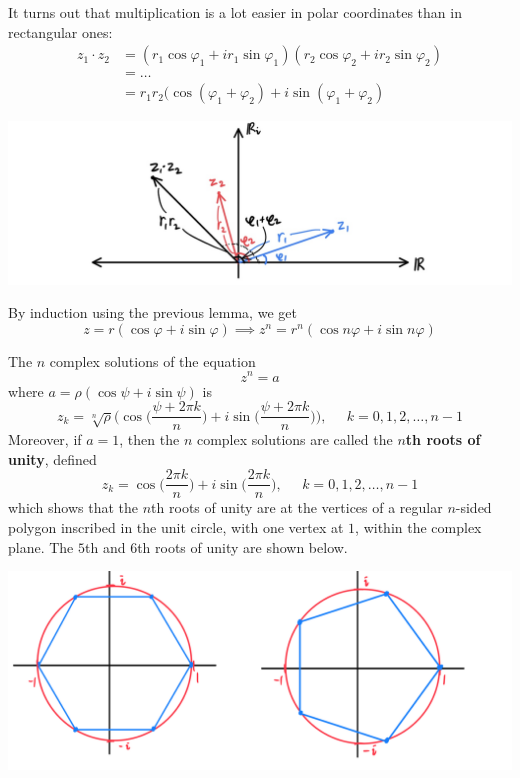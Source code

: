   \begin{lemma}
    It turns out that multiplication is a lot easier in polar coordinates than in rectangular ones: 
    \begin{align*}
        z_1 \cdot z_2 & = (r_1 \cos{\varphi_1} + i r_1 \sin{\varphi_1})(r_2 \cos{\varphi_2} + i r_2 \sin{\varphi_2}) \\
        & = \ldots \\
        & = r_1 r_2 \big(\cos{(\varphi_1 + \varphi_2)} + i \sin{(\varphi_1 + \varphi_2)}
    \end{align*}
    \begin{center}
        \includegraphics[scale=0.25]{img/Multiplication_Complex_Polar_Form.jpg}
    \end{center}
  \end{lemma}

  \begin{theorem}
  By induction using the previous lemma, we get 
  \[z = r ( \cos{\varphi} + i \sin{\varphi}) \implies z^n = r^n (\cos{n\varphi} + i \sin{n \varphi})\]
  \end{theorem}

  \begin{corollary}
  The $n$ complex solutions of the equation 
  \[z^n = a\]
  where $a = \rho (\cos{\psi} + i \sin{\psi})$ is 
  \[z_k = \sqrt[n]{\rho} \bigg( \cos\Big(\frac{\psi + 2\pi k}{n} \Big) + i \sin\Big(\frac{\psi + 2\pi k}{n}\Big) \bigg), \;\;\;\;\; k = 0, 1, 2, \ldots, n-1\]
  Moreover, if $a = 1$, then the $n$ complex solutions are called the \textbf{$n$th roots of unity}, defined
  \[z_k = \cos\Big(\frac{2\pi k}{n}\Big) + i \sin\Big(\frac{2\pi k}{n}\Big), \;\;\;\;\; k = 0, 1, 2, \ldots, n-1\]
  which shows that the $n$th roots of unity are at the vertices of a regular $n$-sided polygon inscribed in the unit circle, with one vertex at $1$, within the complex plane. The $5$th and $6$th roots of unity are shown below. 
  \begin{center}
      \includegraphics[scale=0.27]{img/5th_6th_Roots_of_Unity.PNG}
  \end{center}
  \end{corollary}

